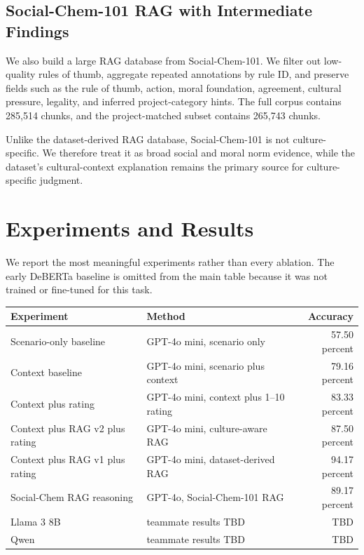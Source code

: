 \documentclass{article}
\begin{document}
\subsection{Social-Chem-101 RAG with Intermediate Findings}

We also build a large RAG database from Social-Chem-101. We filter out low-quality rules of thumb, aggregate repeated annotations by rule ID, and preserve fields such as the rule of thumb, action, moral foundation, agreement, cultural pressure, legality, and inferred project-category hints. The full corpus contains 285,514 chunks, and the project-matched subset contains 265,743 chunks.

Unlike the dataset-derived RAG database, Social-Chem-101 is not culture-specific. We therefore treat it as broad social and moral norm evidence, while the dataset's cultural-context explanation remains the primary source for culture-specific judgment.

\section{Experiments and Results}

We report the most meaningful experiments rather than every ablation. The early DeBERTa baseline is omitted from the main table because it was not trained or fine-tuned for this task.

\begin{center}
\begin{tabular}{l l r}
\hline
Experiment & Method & Accuracy \\
\hline
Scenario-only baseline & GPT-4o mini, scenario only & 57.50 percent \\
Context baseline & GPT-4o mini, scenario plus context & 79.16 percent \\
Context plus rating & GPT-4o mini, context plus 1--10 rating & 83.33 percent \\
Context plus RAG v2 plus rating & GPT-4o mini, culture-aware RAG & 87.50 percent \\
Context plus RAG v1 plus rating & GPT-4o mini, dataset-derived RAG & 94.17 percent \\
Social-Chem RAG reasoning & GPT-4o, Social-Chem-101 RAG & 89.17 percent \\
Llama 3 8B & teammate results TBD & TBD \\
Qwen & teammate results TBD & TBD \\
\hline
\end{tabular}
\end{center}
\end{document}
